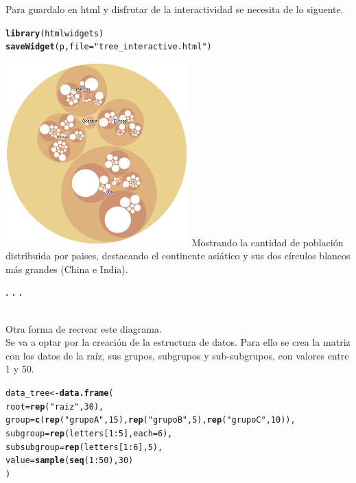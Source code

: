 \documentclass{article}\usepackage[]{graphicx}\usepackage[]{color}
\makeatletter
\newcommand{\hlnum}[1]{\textcolor[rgb]{0.686,0.059,0.569}{#1}}%
\newcommand{\hlstr}[1]{\textcolor[rgb]{0.192,0.494,0.8}{#1}}%
\newcommand{\hlopt}[1]{\textcolor[rgb]{0,0,0}{#1}}%
\newcommand{\hlstd}[1]{\textcolor[rgb]{0.345,0.345,0.345}{#1}}%
\newcommand{\hlkwb}[1]{\textcolor[rgb]{0.69,0.353,0.396}{#1}}%
\newcommand{\hlkwc}[1]{\textcolor[rgb]{0.333,0.667,0.333}{#1}}%
\newcommand{\hlkwd}[1]{\textcolor[rgb]{0.737,0.353,0.396}{\textbf{#1}}}%
\newenvironment{kframe}{%
 \def\at@end@of@kframe{}%
 \ifinner\ifhmode%
  \def\at@end@of@kframe{\end{minipage}}%
  \begin{minipage}{\columnwidth}%
 \fi\fi%
 \def\FrameCommand##1{\hskip\@totalleftmargin \hskip-\fboxsep
 \colorbox{shadecolor}{##1}\hskip-\fboxsep
     \hskip-\linewidth \hskip-\@totalleftmargin \hskip\columnwidth}%
 \MakeFramed {\advance\hsize-\width
   \@totalleftmargin\z@ \linewidth\hsize
   \@setminipage}}%
 {\par\unskip\endMakeFramed%
 \at@end@of@kframe}
\newenvironment{knitrout}{}{} %
\makeatother
\begin{document}
Para guardalo en html y disfrutar de la interactividad se necesita de lo siguente.
\begin{knitrout}
\color{fgcolor}\begin{kframe}
\begin{alltt}
\hlkwd{library}\hlstd{(htmlwidgets)}
\hlkwd{saveWidget}\hlstd{(p,} \hlkwc{file}\hlstd{=}\hlstr{"tree_interactive.html"}\hlstd{)}
\end{alltt}
\end{kframe}
\end{knitrout}
\vbox{
    \centering
    \includegraphics[width=0.53\textwidth]{imag/tree_interactive}
}
Mostrando la cantidad de poblaci\'on distribuida por paises, destacando el continente asi\'atico y sus dos c\'irculos blancos m\'as grandes (China e India). 
\begin{center}
\textbf{. . .}
\end{center}
~\\
Otra forma de recrear este diagrama.~\\ Se va a optar por la creaci\'on de la estructura de datos. Para ello se crea la matriz con los datos de la ra\'iz, sus grupos, subgrupos y sub-subgrupos, con valores entre 1 y 50.
\begin{knitrout}
\color{fgcolor}\begin{kframe}
\begin{alltt}
\hlstd{data_tree} \hlkwb{<-} \hlkwd{data.frame}\hlstd{(}
  \hlkwc{root}\hlstd{=}\hlkwd{rep}\hlstd{(}\hlstr{"raiz"}\hlstd{,} \hlnum{30}\hlstd{),}
  \hlkwc{group}\hlstd{=}\hlkwd{c}\hlstd{(}\hlkwd{rep}\hlstd{(}\hlstr{"grupo A"}\hlstd{,}\hlnum{15}\hlstd{),} \hlkwd{rep}\hlstd{(}\hlstr{"grupo B"}\hlstd{,}\hlnum{5}\hlstd{),} \hlkwd{rep}\hlstd{(}\hlstr{"grupo C"}\hlstd{,}\hlnum{10}\hlstd{)),}
  \hlkwc{subgroup}\hlstd{=} \hlkwd{rep}\hlstd{(letters[}\hlnum{1}\hlopt{:}\hlnum{5}\hlstd{],} \hlkwc{each}\hlstd{=}\hlnum{6}\hlstd{),}
  \hlkwc{subsubgroup}\hlstd{=}\hlkwd{rep}\hlstd{(letters[}\hlnum{1}\hlopt{:}\hlnum{6}\hlstd{],} \hlnum{5}\hlstd{),}
  \hlkwc{value}\hlstd{=}\hlkwd{sample}\hlstd{(}\hlkwd{seq}\hlstd{(}\hlnum{1}\hlopt{:}\hlnum{50}\hlstd{),} \hlnum{30}\hlstd{)}
\hlstd{)}
\end{alltt}
\end{kframe}
\end{knitrout}
\end{document}
